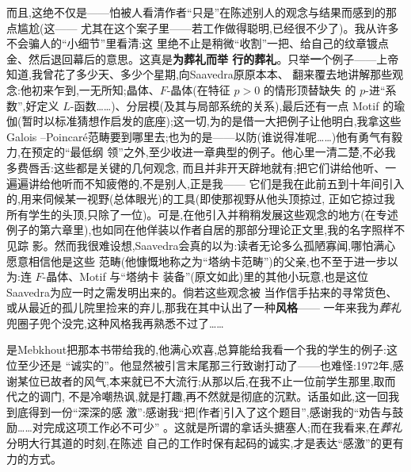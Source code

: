而且,这绝不仅是——怕被人看清作者“只是”在陈述别人的观念与结果而感到的那点尴尬(这——
尤其在这个案子里——若工作做得聪明,已经很不少了)。我从许多不会骗人的“小细节”里看清:这
里绝不止是稍微“收割”一把、给自己的纹章镀点金、然后退回幕后的意思。这真是\textbf{为葬礼而举
行的葬礼}。只举\textbf{一}个例子——上帝知道,我曾花了多少天、多少个星期,向Saavedra原原本本、
翻来覆去地讲解那些观念:他初来乍到,一无所知;晶体、$F$-晶体(在特征 $p>0$ 的情形顶替缺失
的 $p$-进“系数”,好定义 $L$-函数……)、分层模(及其与局部系统的关系),最后还有一点 Motif
的瑜伽(暂时以标准猜想作启发的底座);这一切,为的是借一大把例子让他明白,我拿这些Galois
--Poincaré范畴要到哪里去;也为的是——以防(谁说得准呢……)他有勇气有毅力,在预定的“最低纲
领”之外,至少收进一章典型的例子。他心里一清二楚,不必我多费唇舌:这些都是关键的几何观念,
而且并非开天辟地就有;把它们讲给他听、一遍遍讲给他听而不知疲倦的,不是别人,正是我——
它们是我在此前五到十年间引入的,用来伺候某一视野(总体眼光)的工具(即使那视野从他头顶掠过,
正如它掠过我所有学生的头顶,只除了一位)。可是,在他引入并稍稍发展这些观念的地方(在专述例子的第六章里),也如同在他佯装以作者自居的那部分理论正文里,我的名字照样不见踪
影。然而我很难设想,Saavedra会真的以为:读者无论多么孤陋寡闻,哪怕满心愿意相信他是这些
范畴(他慷慨地称之为“塔纳卡范畴”)的父亲,也不至于进一步以为:连 $F$-晶体、Motif 与“塔纳卡
装备”(原文如此)里的其他小玩意,也是这位Saavedra为应一时之需发明出来的。倘若这些观念被
当作信手拈来的寻常货色、或从最近的\dmark{}孤儿院里捡来的弃儿,那我在其中认出了一种\textbf{风格}——
一年来我为\emph{葬礼}兜圈子兜个没完,这种风格我再熟悉不过了……

是Mebkhout把那本书带给我的,他满心欢喜,总算能给我看一个我的学生的例子:这位至少还是
“诚实的”。他显然被引言末尾那三行致谢打动了——也难怪:1972年,感
谢某位已故者的风气,本来就已不大流行;从那以后,在我不止一位前学生那里,取而代之的调门,
不是冷嘲热讽,就是打趣,再不然就是彻底的沉默。话虽如此,这一回我到底得到一份“深深的感
激”:感谢我“把[作者]引入了这个题目”,感谢我的“劝告与鼓励……对完成这项工作必不可少”
。这就是所谓的拿话头搪塞人;而在我看来,在\emph{葬礼}分明大行其道的时刻,在陈述
自己的工作时保有起码的诚实,才是表达“感激”的更有力的方式。
